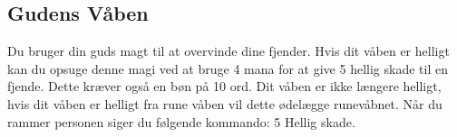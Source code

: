 



\subsection*{Gudens Våben}
Du bruger din guds magt til at overvinde dine fjender. Hvis dit våben er helligt kan du opsuge denne magi ved at bruge 4 mana for at give 5 hellig skade til en fjende. Dette kræver også en bøn på 10 ord. Dit våben er ikke længere helligt, hvis dit våben er helligt fra rune våben vil dette ødelægge runevåbnet. Når du rammer personen siger du følgende kommando: 5 Hellig skade.


